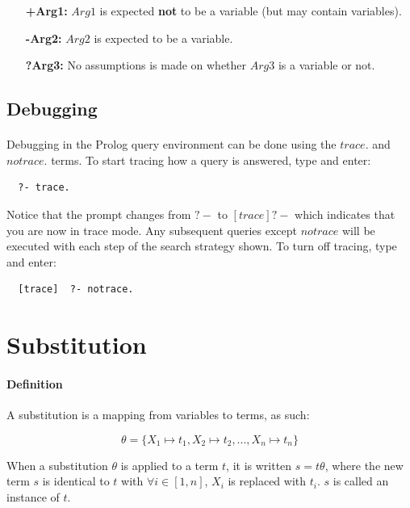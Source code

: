 \documentclass{article}
\begin{document}
\begin{multicols}{2}
  \begin{enumerate}[\hspace{1.4cm}]
  \item[\bf +Arg1:] $Arg1$ is expected {\bf not} to be a variable (but may contain variables).
  \item[\bf -Arg2:] $Arg2$ is expected to be a variable.
  \item[\bf ?Arg3:] No assumptions is made on whether $Arg3$ is a variable or not.
  \end{enumerate}
  
  \subsection{Debugging}
  
  \paragraph{} Debugging in the Prolog query environment can be done using the $trace.$ and $notrace.$ terms. To start tracing how a query is answered, type and enter:
  
  \begin{lstlisting}
  ?- trace.
  \end{lstlisting}
  
  Notice that the prompt changes from $?-$ to $[trace]  ?-$ which indicates that you are now in trace mode. Any subsequent queries except $notrace$ will be executed with each step of the search strategy shown. To turn off tracing, type and enter:
  
  \begin{lstlisting}
  [trace]  ?- notrace.
  \end{lstlisting}
  
  \section{Substitution}
  
  \paragraph{Definition} A substitution is a mapping from variables to terms, as such:
  
  $$\theta = \{ X_1 \mapsto t_1, X_2 \mapsto t_2, ..., X_n \mapsto t_n \}$$
  
  When a substitution $\theta$ is applied to a term $t$, it is written $s = t\theta$, where the new term $s$ is identical to $t$ with $\forall i \in [1, n]$, $X_i$ is replaced with $t_i$. $s$ is called an instance of $t$.
  

\end{multicols}
\end{document}
